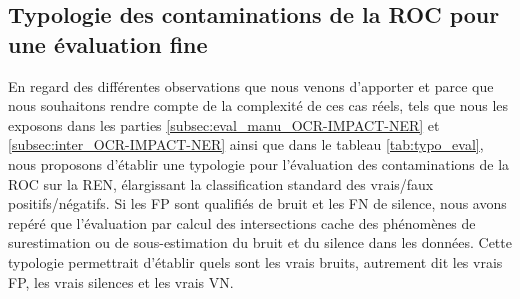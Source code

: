 \subsection{Typologie des contaminations de la ROC pour une évaluation fine}
\label{subsec:Typologie_OCR-IMPACT-NER}
En regard des différentes observations que nous venons d'apporter et parce que nous souhaitons rendre compte de la complexité de ces cas réels, tels que nous les exposons dans les parties \ref{subsec:eval_manu_OCR-IMPACT-NER} et \ref{subsec:inter_OCR-IMPACT-NER} ainsi que dans le tableau \ref{tab:typo_eval}, nous proposons d'établir une typologie pour l'évaluation des contaminations de la ROC sur la REN, élargissant la classification standard des vrais/faux positifs/négatifs. Si les FP sont qualifiés de bruit et les FN de silence, nous avons repéré que l'évaluation par calcul des intersections cache des phénomènes de surestimation ou de sous-estimation du bruit et du silence dans les données. Cette typologie permettrait d'établir quels sont les vrais bruits, autrement dit les vrais FP, les vrais silences et les vrais VN. 


